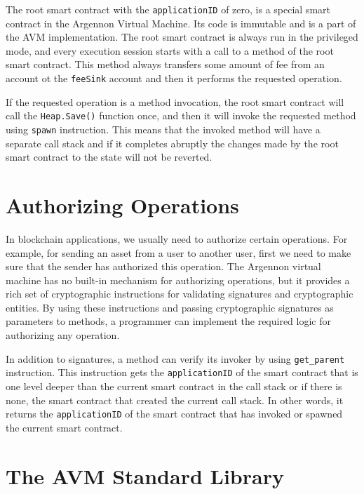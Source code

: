 
The root smart contract with the \texttt{applicationID} of zero, is a special smart contract in the Argennon
Virtual Machine. Its code is immutable and is a part of the AVM implementation. The root smart contract is always
run in the privileged mode, and every execution session starts with a call to a method of the root smart contract.
This method always transfers some amount of fee from an account ot the \texttt{feeSink} account and then it
performs the requested operation.


If the requested operation is a method invocation, the root smart contract will call the \texttt{Heap.Save()}
function once, and then it will invoke the requested method using \texttt{spawn} instruction. This means that the
invoked method will have a separate call stack and if it completes abruptly the changes made by the root
smart contract to the state will not be reverted.


\section{Authorizing Operations}\label{sec:authorizing-operations}

In blockchain applications, we usually need to authorize certain operations. For example, for sending an asset
from a user to another user, first we need to make sure that the sender has authorized this operation. The
Argennon virtual machine has no built-in mechanism for authorizing operations, but it provides a rich set of
cryptographic instructions for validating signatures and cryptographic entities. By using these instructions and
passing cryptographic signatures as parameters to methods, a programmer can implement the required logic
for authorizing any operation.


In addition to signatures, a method can verify its invoker by using \texttt{get\_parent} instruction. This
instruction gets the \texttt{applicationID} of the smart contract that is one level deeper than the current
smart contract in the call stack or if there is none, the smart contract that created the current call stack.
In other words, it returns the \texttt{applicationID} of the smart contract that has invoked or spawned
the current smart contract.


\section{The AVM Standard Library}\label{sec:the-avm-standard-library}
